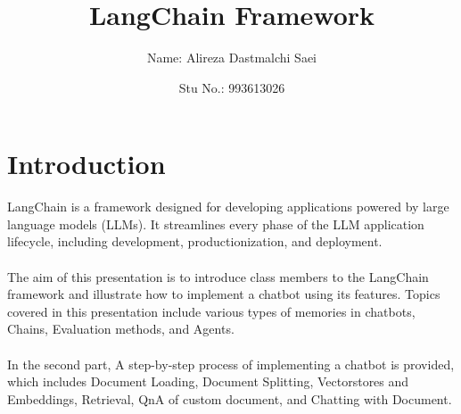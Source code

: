 \documentclass{article}
\title{\textbf{\Huge LangChain Framework }}
\author{Name: Alireza Dastmalchi Saei}
\date{Stu No.: 993613026}
\begin{document}
\maketitle

\pagebreak

\tableofcontents

\pagebreak

\section{Introduction}

LangChain is a framework designed for developing applications powered by large language models (LLMs). It streamlines every phase of the LLM application lifecycle, including development, productionization, and deployment.\\\\
The aim of this presentation is to introduce class members to the LangChain framework and illustrate how to implement a chatbot using its features. Topics covered in this presentation include various types of memories in chatbots, Chains, Evaluation methods, and Agents.\\\\
In the second part, A step-by-step process of implementing a chatbot is provided, which includes Document Loading, Document Splitting, Vectorstores and Embeddings, Retrieval, QnA of custom document, and Chatting with Document.
\end{document}
